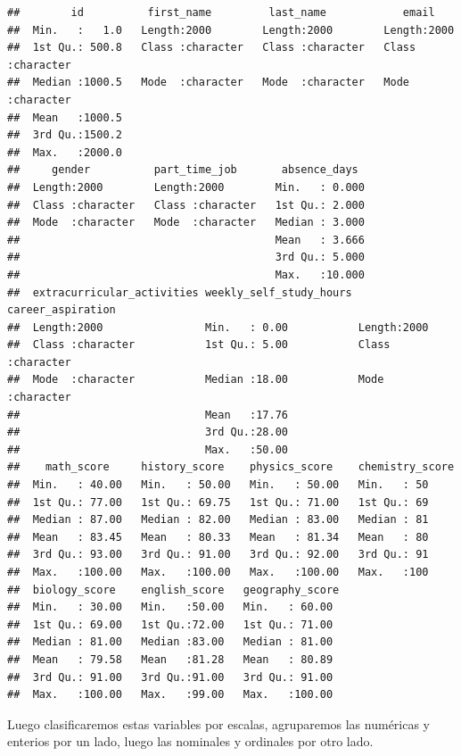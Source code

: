 \documentclass[
]{article}
\begin{document}
\begin{verbatim}
##        id          first_name         last_name            email          
##  Min.   :   1.0   Length:2000        Length:2000        Length:2000       
##  1st Qu.: 500.8   Class :character   Class :character   Class :character  
##  Median :1000.5   Mode  :character   Mode  :character   Mode  :character  
##  Mean   :1000.5                                                           
##  3rd Qu.:1500.2                                                           
##  Max.   :2000.0                                                           
##     gender          part_time_job       absence_days   
##  Length:2000        Length:2000        Min.   : 0.000  
##  Class :character   Class :character   1st Qu.: 2.000  
##  Mode  :character   Mode  :character   Median : 3.000  
##                                        Mean   : 3.666  
##                                        3rd Qu.: 5.000  
##                                        Max.   :10.000  
##  extracurricular_activities weekly_self_study_hours career_aspiration 
##  Length:2000                Min.   : 0.00           Length:2000       
##  Class :character           1st Qu.: 5.00           Class :character  
##  Mode  :character           Median :18.00           Mode  :character  
##                             Mean   :17.76                             
##                             3rd Qu.:28.00                             
##                             Max.   :50.00                             
##    math_score     history_score    physics_score    chemistry_score
##  Min.   : 40.00   Min.   : 50.00   Min.   : 50.00   Min.   : 50    
##  1st Qu.: 77.00   1st Qu.: 69.75   1st Qu.: 71.00   1st Qu.: 69    
##  Median : 87.00   Median : 82.00   Median : 83.00   Median : 81    
##  Mean   : 83.45   Mean   : 80.33   Mean   : 81.34   Mean   : 80    
##  3rd Qu.: 93.00   3rd Qu.: 91.00   3rd Qu.: 92.00   3rd Qu.: 91    
##  Max.   :100.00   Max.   :100.00   Max.   :100.00   Max.   :100    
##  biology_score    english_score   geography_score 
##  Min.   : 30.00   Min.   :50.00   Min.   : 60.00  
##  1st Qu.: 69.00   1st Qu.:72.00   1st Qu.: 71.00  
##  Median : 81.00   Median :83.00   Median : 81.00  
##  Mean   : 79.58   Mean   :81.28   Mean   : 80.89  
##  3rd Qu.: 91.00   3rd Qu.:91.00   3rd Qu.: 91.00  
##  Max.   :100.00   Max.   :99.00   Max.   :100.00
\end{verbatim}

Luego clasificaremos estas variables por escalas, agruparemos las
numéricas y enterios por un lado, luego las nominales y ordinales por
otro lado.
\end{document}
